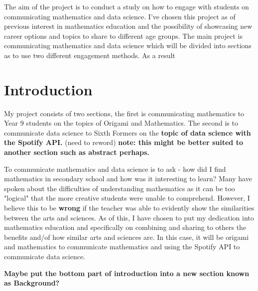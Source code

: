 \documentclass[12pt, a4paper,oneside]{book}
\numberwithin{equation}{section}
\begin{document}

The aim of the project is to conduct a study on how to engage with students on communicating mathematics and data science. I've chosen this project as of previous interest in mathematics education and the possibility of showcasing new career options and topics to share to different age groups. The main project is communicating mathematics and data science which will be divided into sections as to use two different engagement methods. As a result

\tableofcontents

\chapter{Introduction}\label{ch:1}
My project consists of two sections, the first is communicating mathematics to Year 9 students on the topics of Origami and Mathematics. The second is to communicate data science to Sixth Formers on the {\color{red}\textbf{topic of data science with the Spotify API.}} (need to reword) {\color{blue}\textbf{note: this might be better suited to another section such as abstract perhaps.}}

To communicate mathematics and data science is to ask - how did I find mathematics in secondary school and how was it interesting to learn? Many have spoken about the difficulties of understanding mathematics as it can be too "logical" that the more creative students were unable to comprehend. However, I believe this to be {\color{red}\textbf{wrong}} if the teacher was able to evidently show the similarities between the arts and sciences. As of this, I have chosen to put my dedication into mathematics education and specifically on combining and sharing to others the benefits and/of how similar arts and sciences are. In this case, it will be origami and mathematics to communicate mathematics and using the Spotify API to communicate data science.

{\color{blue}\textbf{Maybe put the bottom part of introduction into a new section known as Background?}}
\end{document}
